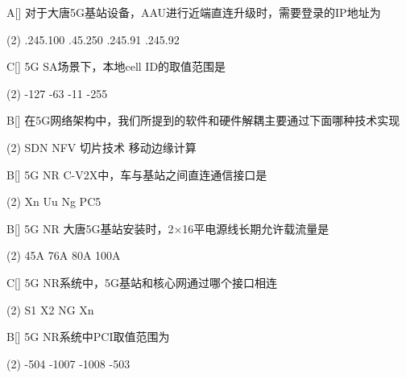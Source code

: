 \begin{choice}{A}[]
    对于大唐5G基站设备，AAU进行近端直连升级时，需要登录的IP地址为
    \begin{tasks}(2)
        .245.100
        .45.250
        .245.91
        .245.92
    \end{tasks}
\end{choice}


\begin{choice}{C}[]
    5G SA场景下，本地cell ID的取值范围是
    \begin{tasks}(2)
        -127
        -63
        -11
        -255
    \end{tasks}
\end{choice}

\begin{choice}{B}[]
    在5G网络架构中，我们所提到的软件和硬件解耦主要通过下面哪种技术实现
    \begin{tasks}(2)
        \task SDN
        \task NFV
        \task 切片技术
        \task 移动边缘计算
    \end{tasks}
\end{choice}




\begin{choice}{B}[]
    5G NR C-V2X中，车与基站之间直连通信接口是
    \begin{tasks}(2)
        \task Xn
        \task Uu
        \task Ng
        \task PC5
    \end{tasks}
\end{choice}


\begin{choice}{B}[]
    5G NR 大唐5G基站安装时，2×16平电源线长期允许载流量是
    \begin{tasks}(2)
        \task 45A
        \task 76A
        \task 80A
        \task 100A
    \end{tasks}
\end{choice}


\begin{choice}{C}[]
    5G NR系统中，5G基站和核心网通过哪个接口相连
    \begin{tasks}(2)
        \task S1
        \task X2
        \task NG
        \task Xn
    \end{tasks}
\end{choice}


\begin{choice}{B}[]
    5G NR系统中PCI取值范围为
    \begin{tasks}(2)
        -504
        -1007
        -1008
        -503
    \end{tasks}
\end{choice}

